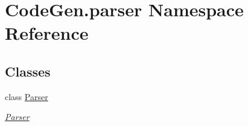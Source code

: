 \hypertarget{namespaceCodeGen_1_1parser}{}\section{Code\+Gen.\+parser Namespace Reference}
\label{namespaceCodeGen_1_1parser}
\subsection*{Classes}
\begin{DoxyCompactItemize}
\item 
class \mbox{\hyperlink{classCodeGen_1_1parser_1_1Parser}{Parser}}
\begin{DoxyCompactList}\small\item\em \mbox{\hyperlink{classCodeGen_1_1parser_1_1Parser}{Parser}} \end{DoxyCompactList}\end{DoxyCompactItemize}
